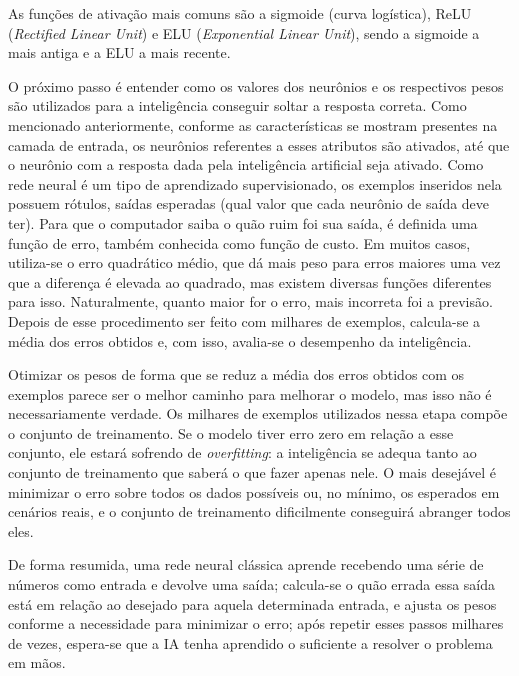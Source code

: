As funções de ativação mais comuns são a sigmoide (curva logística), ReLU (\textit{Rectified Linear Unit}) e ELU (\textit{Exponential Linear Unit}), sendo a sigmoide a mais antiga e a ELU a mais recente.

O próximo passo é entender como os valores dos neurônios e os respectivos pesos são utilizados para a inteligência conseguir soltar a resposta correta.
Como mencionado anteriormente, conforme as características se mostram presentes na camada de entrada, os neurônios referentes a esses atributos são ativados, até que o neurônio com a resposta dada pela inteligência artificial seja ativado.
Como rede neural é um tipo de aprendizado supervisionado, os exemplos inseridos nela possuem rótulos, saídas esperadas (qual valor que cada neurônio de saída deve ter).
Para que o computador saiba o quão ruim foi sua saída, é definida uma função de erro, também conhecida como função de custo.
Em muitos casos, utiliza-se o erro quadrático médio, que dá mais peso para erros maiores uma vez que a diferença é elevada ao quadrado, mas existem diversas funções diferentes para isso.
Naturalmente, quanto maior for o erro, mais incorreta foi a previsão.
Depois de esse procedimento ser feito com milhares de exemplos, calcula-se a média dos erros obtidos e, com isso, avalia-se o desempenho da inteligência.

Otimizar os pesos de forma que se reduz a média dos erros obtidos com os exemplos parece ser o melhor caminho para melhorar o modelo, mas isso não é necessariamente verdade.
Os milhares de exemplos utilizados nessa etapa compõe o conjunto de treinamento.
Se o modelo tiver erro zero em relação a esse conjunto, ele estará sofrendo de \textit{overfitting}: a inteligência se adequa tanto ao conjunto de treinamento que saberá o que fazer apenas nele.
O mais desejável é minimizar o erro sobre todos os dados possíveis ou, no mínimo, os esperados em cenários reais, e o conjunto de treinamento dificilmente conseguirá abranger todos eles.

De forma resumida, uma rede neural clássica aprende recebendo uma série de números como entrada e devolve uma saída;
calcula-se o quão errada essa saída está em relação ao desejado para aquela determinada entrada, e ajusta os pesos conforme a necessidade para minimizar o erro;
após repetir esses passos milhares de vezes, espera-se que a IA tenha aprendido o suficiente a resolver o problema em mãos.


